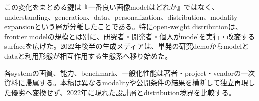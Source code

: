 この変化をまとめる鍵は『一番良い画像modelはどれか』ではなく、understanding、generation、data、personalization、distribution、modality expansionという層が分離したことである。特にopen-weight distributionは、frontier modelの規模とは別に、研究者・開発者・個人がmodelを実行・改変するsurfaceを広げた。2022年後半の生成メディアは、単発の研究demoからmodelとdataと利用形態が相互作用する生態系へ移り始めた。\autocite{src-13aed13ff36c,src-16a1a1dc486e,src-1b692f6d18b5,src-26aadbc0393f,src-27297a80fac0,src-2832ee43ab8f,src-2c38d2f354fa,src-76875f66d5f3,src-86ce6205a4ed,src-929080260e16,src-b2dbb3098853,src-c19139f0be76,src-c5c7eddb6cf6,src-cf669aed6653,src-e0a494dc6724}


\begin{claimboundary}
各systemの画質、能力、benchmark、一般化性能は著者・project・vendorの一次資料に帰属する。本稿は異なるmodalityや公開条件の結果を横断して独立再現した優劣へ変換せず、2022年に現れた設計層とdistribution境界を比較する。\autocite{src-16a1a1dc486e,src-26aadbc0393f,src-27297a80fac0,src-2832ee43ab8f,src-2c38d2f354fa,src-86ce6205a4ed,src-929080260e16}
\end{claimboundary}
